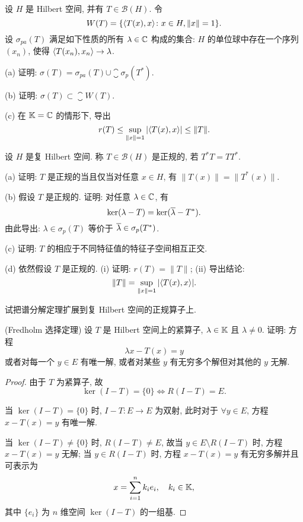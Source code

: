 \begin{exercise}
    设 $H$ 是 Hilbert 空间, 并有 $T\in\mathcal{B}(H)$. 令
    \[W(T)=\{\langle T(x),x\rangle\colon x\in H,\|x\|=1\}.\]
    设 $\sigma_{pa}(T)$ 满足如下性质的所有 $\lambda\in\mathbb{C}$ 构成的集合:
    $H$ 的单位球中存在一个序列 $(x_n)$, 使得 $\langle T(x_n),x_n\rangle\to\lambda$.

    (a) 证明: $\sigma(T)=\sigma_{pa}(T)\cup\closure{\sigma_p(T^*)}$.

    (b) 证明: $\sigma(T)\subset\closure{W(T)}$.

    (c) 在 $\mathbb{K}=\mathbb{C}$ 的情形下, 导出
    \[r(T)\leq\sup_{\|x\|=1}|\langle T(x),x\rangle|\leq\|T\|.\]
\end{exercise}



\begin{exercise}
    设 $H$ 是复 Hilbert 空间. 称 $T\in\mathcal{B}(H)$ 是正规的, 若 $T^*T=TT^*$.

    (a) 证明: $T$ 是正规的当且仅当对任意 $x\in H$, 有 $\|T(x)\|=\|T^*(x)\|$.

    (b) 假设 $T$ 是正规的. 证明: 对任意 $\lambda\in\mathbb{C}$, 有
    \[\ker(\lambda-T)=\ker(\overline{\lambda}-T^*).\]
    由此导出: $\lambda\in\sigma_p(T)$ 等价于 $\overline{\lambda}\in\sigma_p(T^*)$.

    (c) 证明: $T$ 的相应于不同特征值的特征子空间相互正交.

    (d) 依然假设 $T$ 是正规的.
    (i) 证明: $r(T)=\|T\|$; (ii) 导出结论:
    \[\|T\|=\sup_{\|x\|=1}|\langle T(x),x\rangle|.\]
\end{exercise}



\begin{exercise}
    试把谱分解定理扩展到复 Hilbert 空间的正规算子上.
\end{exercise}



\begin{exercise}(Fredholm 选择定理)
    设 $T$ 是 Hilbert 空间上的紧算子, $\lambda\in\mathbb{K}$ 且 $\lambda\neq 0$. 证明: 方程
    \[\lambda x-T(x)=y\]
    或者对每一个 $y\in E$ 有唯一解, 或者对某些 $y$ 有无穷多个解但对其他的 $y$ 无解.
\end{exercise}

\begin{proof}
  由于 $T$ 为紧算子, 故
  \[\ker(I-T) = \{0\}\iff R(I-T) = E.\]

  当 $\ker(I-T) = \{0\}$ 时, $I-T\colon E\to E$ 为双射, 此时对于 $\forall y\in E$,
  方程 $x-T(x)=y$ 有唯一解.

  当 $\ker(I-T) \neq \{0\}$ 时, $R(I-T)\neq E$, 故当 $y\in E\setminus R(I-T)$ 时,
  方程 $x-T(x)=y$ 无解; 当 $y\in R(I-T)$ 时, 方程 $x-T(x)=y$ 有无穷多解并且可表示为
  \[x = \sum_{i=1}^n k_ie_i,\quad k_i\in\mathbb{K},\]
  其中 $\{e_i\}$ 为 $n$ 维空间 $\ker(I-T)$ 的一组基.
\end{proof}


